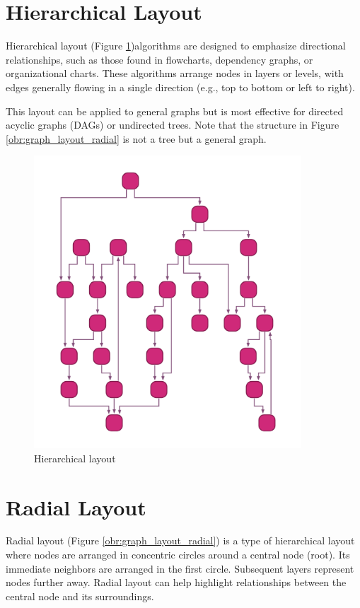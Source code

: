 \section{Hierarchical Layout}

Hierarchical layout (Figure \ref{obr:graph_layout_hierarchical})algorithms are designed to emphasize directional relationships, such as those found in flowcharts,
dependency graphs, or organizational charts. These algorithms arrange nodes in layers or levels, with edges generally
flowing in a single direction (e.g., top to bottom or left to right).

This layout can be applied to general graphs but is most effective for directed acyclic graphs (DAGs) or undirected trees.
Note that the structure in Figure \ref{obr:graph_layout_radial} is not a tree but a general graph.

\begin{figure}[h]\centering
    \includegraphics[width=100mm, keepaspectratio]{img/graph_layout_hiearchichal.png}
    \caption{Hierarchical layout\cite{graph_layout_demos}}
    \label{obr:graph_layout_hierarchical}
\end{figure}

\section{Radial Layout}

Radial layout (Figure \ref{obr:graph_layout_radial}) is a type of hierarchical layout where nodes are arranged in concentric circles around a central node (root).
Its immediate neighbors are arranged in the first circle. Subsequent layers represent nodes further away.
Radial layout can help highlight relationships between the central node and its surroundings.

